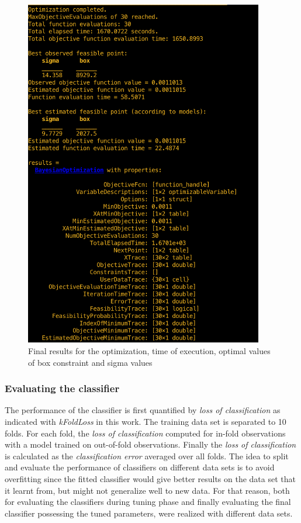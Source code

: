 \begin{figure}
\begin{center}
\includegraphics[width=0.93\textwidth]{figures/optimizationResultsStuckFault}    %
\caption{Final results for the optimization, time of execution, optimal values of box constraint and sigma values} 
\label{fig:optimBayesianResults}
\end{center}
\end{figure}

\subsubsection{Evaluating the classifier}
\label{evalClassifier}

The performance of the classifier is first quantified by \emph{loss of classification} as indicated with \emph{kFoldLoss} in this work. 
The training data set is  separated to 10 folds. For each fold, the \emph{loss of classification} computed for in-fold observations with a model trained on out-of-fold observations. 
Finally the \emph{loss of classification} is calculated as the \emph{classification error} averaged over all folds.
The idea to split and evaluate the performance of classifiers on different data sets is to avoid overfitting since the fitted classifier would give better results on the data set that it learnt from, but might not generalize well to new data. 
For that reason, both for evaluating the classifiers during tuning phase and finally evaluating the final classifier possessing the tuned parameters, were realized with different data sets.

